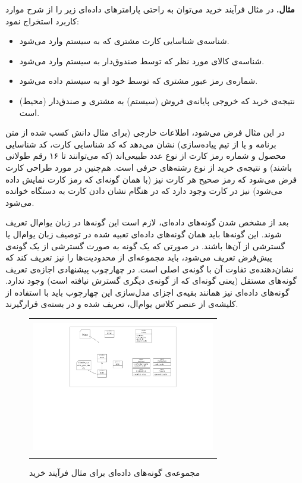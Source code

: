 \textbf{مثال. }  در مثال فرآیند خرید می‌توان به راحتی پارامترهای داده‌ای زیر را از شرح موارد کاربرد استخراج نمود: 
\begin{itemize}
\item شناسه‌ی شناسایی کارت مشتری که به سیستم وارد می‌شود.
\item شناسه‌ی کالای مورد نظر که توسط صندوق‌دار به سیستم وارد می‌شود.
\item شماره‌ی رمز عبور مشتری که توسط خود او به سیستم داده می‌شود.
\item نتیجه‌ی خرید که خروجی پایانه‌ی فروش (سیستم) به مشتری و صندق‌دار (محیط) است.
\end{itemize}
در این مثال فرض می‌شود، اطلاعات خارجی (برای مثال دانش کسب شده از متن برنامه و یا از تیم پیاده‌سازی) نشان می‌دهد که کد شناسایی کارت، کد شناسایی محصول و شماره رمز کارت از نوع عدد طبیعی‌اند (که می‌توانند تا ۱۶ رقم طولانی باشند) و نتیجه‌ی خرید از نوع رشته‌های حرفی است. هم‌چنین در مورد طراحی کارت فرض می‌شود که رمز صحیح هر کارت نیز (با همان گونه‌ای که رمز کارت نمایش داده می‌شود) نیز در کارت وجود دارد که در هنگام نشان دادن کارت به دستگاه خوانده می‌شود.

بعد از مشخص شدن گونه‌های داده‌ای، لازم است این گونه‌ها در زبان یوام‌ال تعریف شوند. این گونه‌ها باید همان گونه‌های داده‌ای تعبیه شده در توصیف زبان یو‌ام‌ال یا گسترشی از آن‌ها باشند. در صورتی که یک گونه به صورت گسترشی از یک گونه‌ی پیش‌فرض تعریف می‌شود، باید مجموعه‌ای از محدودیت‌ها را نیز تعریف کند که نشان‌دهنده‌ی تفاوت آن با گونه‌ی اصلی است. در چهارچوب پیشنهادی اجازه‌ی تعریف گونه‌های مستقل (یعنی گونه‌ای که از گونه‌ی دیگری گسترش نیافته است) وجود ندارد. گونه‌های داده‌ای نیز همانند بقیه‌ی اجزای مدل‌سازی این چهارچوب باید با استفاده از \gls*{کلیشه}‌ی  از \gls*{عنصر} کلاس یو‌ام‌ال، تعریف شده و در بسته‌ی {\large{}} قرارگیرند.

\begin{figure}
    \begin{center}
    \begin{tabular}{| c |}
   	\hline
	\\
  	 \includegraphics[width=8cm]{4-ProposedFramework/Figures/purchaseTypes.pdf} \\
	\\
	\hline
  \end{tabular}
  \end{center}
   \caption{\label{fig:purchaseTypes} مجموعه‌ی گونه‌های داده‌ای برای مثال فرآیند خرید}
\end{figure}

